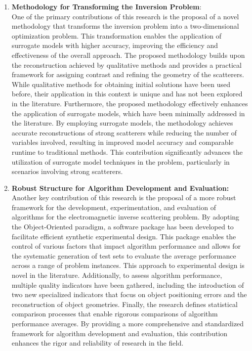 		\begin{enumerate}
			\item \textbf{Methodology for Transforming the Inversion Problem}: \\ One of the primary contributions of this research is the proposal of a novel methodology that transforms the inversion problem into a two-dimensional optimization problem. This transformation enables the application of surrogate models with higher accuracy, improving the efficiency and effectiveness of the overall approach. The proposed methodology builds upon the reconstruction achieved by qualitative methods and provides a practical framework for assigning contrast and refining the geometry of the scatterers. While qualitative methods for obtaining initial solutions have been used before, their application in this context is unique and has not been explored in the literature. Furthermore, the proposed methodology effectively enhances the application of surrogate models, which have been minimally addressed in the literature. By employing surrogate models, the methodology achieves accurate reconstructions of strong scatterers while reducing the number of variables involved, resulting in improved model accuracy and comparable runtime to traditional methods. This contribution significantly advances the utilization of surrogate model techniques in the problem, particularly in scenarios involving strong scatterers.
			\item \textbf{Robust Structure for Algorithm Development and Evaluation:} \\ Another key contribution of this research is the proposal of a more robust framework for the development, experimentation, and evaluation of algorithms for the electromagnetic inverse scattering problem. By adopting the Object-Oriented paradigm, a software package has been developed to facilitate efficient synthetic experimental design. This package enables the control of various factors that impact algorithm performance and allows for the systematic generation of test sets to evaluate the average performance across a range of problem instances. This approach to experimental design is novel in the literature. Additionally, to assess algorithm performance, multiple quality indicators have been gathered, including the introduction of two new specialized indicators that focus on object positioning errors and the reconstruction of object geometries. Finally, the research defines statistical comparison processes that enable rigorous comparisons of algorithm performance averages. By providing a more comprehensive and standardized framework for algorithm development and evaluation, this contribution enhances the rigor and reliability of research in the field.
		\end{enumerate}
		

